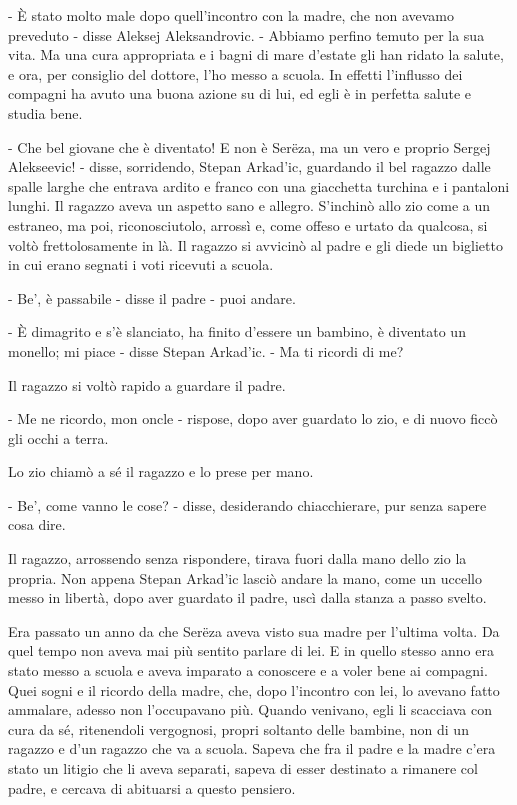 - È stato molto male dopo quell'incontro con la madre, che non avevamo preveduto - disse Aleksej Aleksandrovic. - Abbiamo perfino temuto per la sua vita. Ma una cura appropriata e i bagni di mare d'estate gli han ridato la salute, e ora, per consiglio del dottore, l'ho messo a scuola. In effetti l'influsso dei compagni ha avuto una buona azione su di lui, ed egli è in perfetta salute e studia bene. 

- Che bel giovane che è diventato! E non è Serëza, ma un vero e proprio Sergej Alekseevic! - disse, sorridendo, Stepan Arkad'ic, guardando il bel ragazzo dalle spalle larghe che entrava ardito e franco con una giacchetta turchina e i pantaloni lunghi. Il ragazzo aveva un aspetto sano e allegro. S'inchinò allo zio come a un estraneo, ma poi, riconosciutolo, arrossì e, come offeso e urtato da qualcosa, si voltò frettolosamente in là. Il ragazzo si avvicinò al padre e gli diede un biglietto in cui erano segnati i voti ricevuti a scuola. 

- Be', è passabile - disse il padre - puoi andare. 

- È dimagrito e s'è slanciato, ha finito d'essere un bambino, è diventato un monello; mi piace - disse Stepan Arkad'ic. - Ma ti ricordi di me? 

Il ragazzo si voltò rapido a guardare il padre. 

- Me ne ricordo, mon oncle - rispose, dopo aver guardato lo zio, e di nuovo ficcò gli occhi a terra. 
\enlargethispage*{1\baselineskip}

Lo zio chiamò a sé il ragazzo e lo prese per mano. 

- Be', come vanno le cose? - disse, desiderando chiacchierare, pur senza sapere cosa dire. 

Il ragazzo, arrossendo senza rispondere, tirava fuori dalla mano dello zio la propria. Non appena Stepan Arkad'ic lasciò andare la mano, come un uccello messo in libertà, dopo aver guardato il padre, uscì dalla stanza a passo svelto. 

Era passato un anno da che Serëza aveva visto sua madre per l'ultima volta. Da quel tempo non aveva mai più sentito parlare di lei. E in quello stesso anno era stato messo a scuola e aveva imparato a conoscere e a voler bene ai compagni. Quei sogni e il ricordo della madre, che, dopo l'incontro con lei, lo avevano fatto ammalare, adesso non l'occupavano più. Quando venivano, egli li scacciava con cura da sé, ritenendoli vergognosi, propri soltanto delle bambine, non di un ragazzo e d'un ragazzo che va a scuola. Sapeva che fra il padre e la madre c'era stato un litigio che li aveva separati, sapeva di esser destinato a rimanere col padre, e cercava di abituarsi a questo pensiero. 

